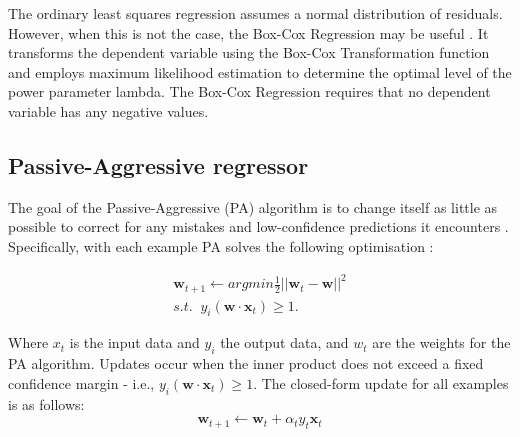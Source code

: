 \documentclass[final,3p,times,twocolumn,numbers]{elsarticle}
\begin{document}
The ordinary least squares regression assumes a normal distribution of residuals. However, when this is not the case, the Box-Cox Regression may be useful \cite{Box1964}. It transforms the dependent variable using the Box-Cox Transformation function and employs maximum likelihood estimation to determine the optimal level of the power parameter lambda. The Box-Cox Regression requires that no dependent variable has any negative values.


%
%
%
%

\subsection{Passive-Aggressive regressor}

The goal of the Passive-Aggressive (PA) algorithm is to change itself as little as possible to correct for any mistakes and low-confidence predictions it encounters \cite{Gzik2014}. Specifically, with each example PA solves the following optimisation \cite{Ma2009}:

\begin{align}
    \boldsymbol{w}_{t+1}\leftarrow argmin \frac{1}{2}\left|\left|{\boldsymbol{w}_t-\boldsymbol{w}}\right|\right|^2 \\
    s.t. \; \; y_i(\boldsymbol{w}\cdot \boldsymbol{x}_t)\geq1.
\end{align}

\noindent Where $x_t$ is the input data and $y_i$ the output data, and $w_t$ are the weights for the PA algorithm. Updates occur when the inner product does not exceed a fixed confidence margin - i.e., $y_i(\boldsymbol{w}\cdot \boldsymbol{x}_t)\geq1$. The closed-form update for all examples is as follows:
\begin{equation}
    \boldsymbol{w}_{t+1}\leftarrow \boldsymbol{w}_{t} + \alpha_t y_t \boldsymbol{x}_t
\end{equation}
\end{document}
